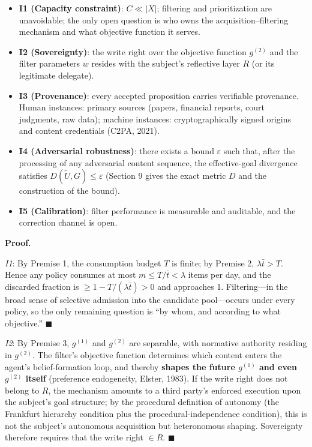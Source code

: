 \documentclass[
  11pt]{article}
\providecommand{\tightlist}{%
  \setlength{\itemsep}{0pt}\setlength{\parskip}{0pt}}
\begin{document}
\begin{itemize}
\tightlist
\item
  \textbf{I1 (Capacity constraint)}: \(C \ll |X|\); filtering and
  prioritization are unavoidable; the only open question is who owns the
  acquisition--filtering mechanism and what objective function it
  serves.
\item
  \textbf{I2 (Sovereignty)}: the write right over the objective function
  \(g^{(2)}\) and the filter parameters \(w\) resides with the subject's
  reflective layer \(R\) (or its legitimate delegate).
\item
  \textbf{I3 (Provenance)}: every accepted proposition carries
  verifiable provenance. Human instances: primary sources (papers,
  financial reports, court judgments, raw data); machine instances:
  cryptographically signed origins and content credentials (C2PA, 2021).
\item
  \textbf{I4 (Adversarial robustness)}: there exists a bound
  \(\varepsilon\) such that, after the processing of any adversarial
  content sequence, the effective-goal divergence satisfies
  \(D(\tilde U, G) \le \varepsilon\) (Section 9 gives the exact metric
  \(D\) and the construction of the bound).
\item
  \textbf{I5 (Calibration)}: filter performance is measurable and
  auditable, and the correction channel is open.
\end{itemize}

\textbf{Proof.}

\emph{I1}: By Premise 1, the consumption budget \(T\) is finite; by
Premise 2, \(\lambda \bar t > T\). Hence any policy consumes at most
\(m \le T/\bar t < \lambda\) items per day, and the discarded fraction
is \(\ge 1 - T/(\lambda\bar t) > 0\) and approaches 1. Filtering---in
the broad sense of selective admission into the candidate pool---occurs
under every policy, so the only remaining question is ``by whom, and
according to what objective.'' \(\blacksquare\)

\emph{I2}: By Premise 3, \(g^{(1)}\) and \(g^{(2)}\) are separable, with
normative authority residing in \(g^{(2)}\). The filter's objective
function determines which content enters the agent's belief-formation
loop, and thereby \textbf{shapes the future \(g^{(1)}\) and even
\(g^{(2)}\) itself} (preference endogeneity, Elster, 1983). If the write
right does not belong to \(R\), the mechanism amounts to a third party's
enforced execution upon the subject's goal structure; by the procedural
definition of autonomy (the Frankfurt hierarchy condition plus the
procedural-independence condition), this is not the subject's autonomous
acquisition but heteronomous shaping. Sovereignty therefore requires
that the write right \(\in R\). \(\blacksquare\)
\end{document}
